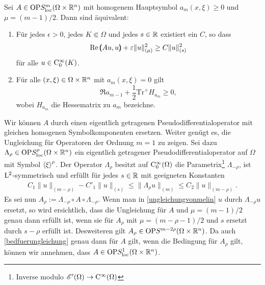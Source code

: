 \begin{thm}
Sei $A\in\mathrm{OP}S^{m}_{\rm loc}(\Omega\times\mathbb R^n)$ mit homogenem Hauptsymbol $a_m(x,\xi)\ge0$ und $\mu=(m-1)/2$. Dann sind \"aquivalent:
\begin{enumerate}
\item F\"ur jedes $\epsilon>0$, jedes $K\Subset\Omega$ und jedes $s\in\mathbb R$ existiert ein $C$, so dass
\begin{equation}
    \operatorname{Re} \pmb(Au,u\pmb) + \varepsilon \|u\|^2_{(\mu)}  \ge C\|u\|_{(s)}^2\label{ungleichungvonmelin}
\end{equation}
für alle $u\in\mathrm C_0^\infty(K)$.
\item
Für alle $(x,\xi)\in\Omega\times\mathbb R^n$ mit $a_m(x,\xi)=0$ gilt
\begin{equation}\label{bedfuerungleichung}
   \Re a_{m-1} +  \frac 1 2 {\mathrm{Tr}}^+ H_{a_m} \ge 0,
\end{equation}
wobei $H_{a_m}$ die Hessematrix zu $a_m$ bezeichne.
\end{enumerate}
\end{thm}

Wir können $A$ durch einen eigentlich getragenen Pseudodifferentialoperator mit gleichen homogenen Symbolkomponenten ersetzen.  Weiter genügt es, die Ungleichung für Operatoren der Ordnung $m=1$ zu zeigen. Sei dazu $\Lambda_\rho\in\mathrm{OP}S^\rho_{\rm loc}(\Omega\times\mathbb R^n)$ ein eigentlich getragener Pseudodifferentialoperator auf $\Omega$ mit Symbol $\braket\xi^\rho$.
Der Operator $\Lambda_\rho$ besitzt auf $\mathrm C_0^\infty(\Omega)$ die Parametrix\footnote{Inverse modulo $\mathscr E'(\Omega)\to\mathrm C^\infty(\Omega)$}  $\Lambda_{-\rho}$, ist $\mathrm L^2$-symmetrisch und erfüllt für jedes $s\in\mathbb R$ mit geeigneten Konstanten
\begin{align}
   C_1 \|u\|_{(m-\rho)} - C'_1 \|u\|_{(s)} \le    \|\Lambda_\rho u\|_{(m)} \le   C_2 \|u\|_{(m-\rho)}.
\end{align}
Es sei nun $A_\rho:=\Lambda_{-\rho} \circ A\circ\Lambda_{-\rho}$. Wenn man in \eqref{ungleichungvonmelin} $u$ durch $\Lambda_{-\rho} u$ ersetzt, so wird ersichtlich, dass die Ungleichung für $A$ und $\mu=(m-1)/2$ genau dann erfüllt ist, wenn sie für $A_\rho$ mit $\mu=(m-\rho-1)/2$ und $s$ ersetzt durch $s-\rho$ erfüllt ist. Desweiteren gilt $A_\rho\in \mathrm{OP}S^{m-2\rho}(\Omega\times\mathbb R^n)$. 
Da auch \eqref{bedfuerungleichung} genau dann für $A$ gilt, wenn die Bedingung für $A_\rho$ gilt, können wir annehmen, dass $A\in\mathrm{OP}S^1_{\rm loc}(\Omega\times\mathbb R^n)$.


